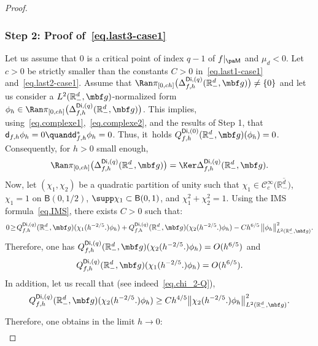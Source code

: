 \begin{proof}
\subsubsection*{Step 2: Proof of~\eqref{eq.last3-case1}}
Let us assume that $0$ is a critical point of index $q-1$ of
$f|_{\pa \mathsf M}$ and $\mu_{d}<0$. Let $c>0$ be strictly
smaller than the constants $C>0$ in~\eqref{eq.last1-case1}
and~\eqref{eq.last2-case1}. Assume that $\Ran \pi_{[0,ch]}\bigl(\Delta_{f,h}^{\mathsf{Di},(q)}(\mathbb R_-^d, \mbf g) \bigr)\neq
\{0\}$ and let us consider a $L^2(\mathbb R_-^d, \mbf g) $-normalized form $\phi_h\in \Ran \pi_{[0,ch]}\bigl(\Delta_{f,h}^{\mathsf{Di},(q)}(\mathbb R_-^d, \mbf g) \bigr)$. This implies, using~\eqref{eq.complexe1},~\eqref{eq.complexe2}, and the results of {Step 1}, that
$\mathsf d_{f,h}\phi_h= 0 \quand \mathsf d_{f,h}^*\phi_h=0$.
Thus, it~holds $ Q_{f,h}^{\mathsf{Di},(0)}(\mathbb R^d_-,\mbf g)(\phi_h)=0$.
Consequently, for $h>0$ small enough,
\[
\Ran \pi_{[0,ch]}\bigl(\Delta_{f,h}^{\mathsf{Di},(q)}(\mathbb R^d_-,\mbf g)\bigr)=\Ker \Delta_{f,h}^{\mathsf{Di},(q)}(\mathbb R^d_-,\mbf g).
\]
Now, let $(\chi_1,\chi_2)$ be a quadratic partition of unity such that $\chi_1\in \mathcal C_c^\infty (\overline {\mathbb R_-^d)}$, $\chi_1=1$ on $\mathsf B(0,1/2)$, $\supp \chi_1\subset \mathsf B(0,1)$, and $\chi_1^2+\chi_2^2=1$.
Using the IMS formula~\eqref{eq.IMS}, there exists $C>0$ such that:\vspace*{-3pt}
\[
0 \!\ge\! Q_{f,h}^{\mathsf{Di},(q)}(\mathbb R^d_-,\mbf g)
(\chi_1(h^{-2/5 }.) \phi_h)+Q_{f,h}^{\mathsf{Di},(q)}(\mathbb R^d_-,\mbf g)(\chi_2(h^{-2/5 }.) \phi_h)
-C h^{6/5}\, \big \Vert
\phi_h\big \Vert_{L^2(\mathbb R^d_-,\mbf g)}^2.
\]
Therefore, one has $Q_{f,h}^{\mathsf{Di},(q)}(\mathbb R^d_-,\mbf g)(\chi_2(h^{-2/5 }.) \phi_h) =O(h^{6/5})$ and\vspace*{-3pt}
\begin{equation}\label{quad-chi1-b}
Q_{f,h}^{\mathsf{Di},(q)}(\mathbb R^d_-,\mbf g) (\chi_1(h^{-2/5 }.)\phi_h)= O (h^{6/5}).
\end{equation}
In addition, let us recall that (see indeed~\eqref{eq.chi_2-Q}),\vspace*{-3pt}
\[
Q_{f,h}^{\mathsf{Di},(q)}(\mathbb R^d_-,\mbf g)(\chi_2(h^{-2/5 }.) \phi_h)\ge Ch^{4/5} \big \Vert \chi_2(h^{-2/5 }.) \phi_h\big \Vert_{L^2(\mathbb R^d_-,\mbf g)}^2.
\]
Therefore, one obtains in the limit $h\to 0$:\vspace*{-3pt}
\begin{equation}\label{norme-chi-b}
\begin{aligned}

\end{aligned}
\end{equation}
\end{proof}
